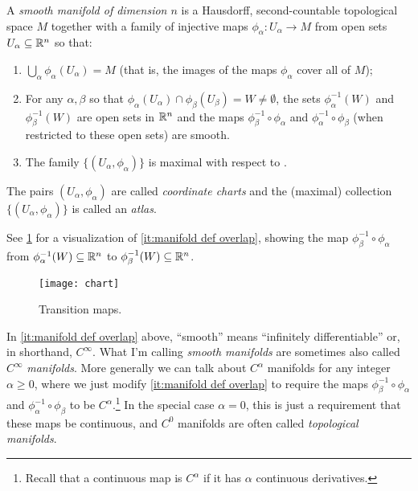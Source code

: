 \begin{definition}\label{def:manifold}
	A \emph{smooth manifold of dimension $n$} is a Hausdorff, second-countable topological space $M$ together with a family of injective maps $\phi_\alpha: U_\alpha \to M$ from open sets $U_\alpha \subseteq \mathbb{R}^n$ so that:
	\begin{enumerate}
		\item \label{it:manifold def cover}$\bigcup_\alpha \phi_\alpha(U_\alpha) = M$ (that is, the images of the maps $\phi_\alpha$ cover all of $M$);
		\item \label{it:manifold def overlap}For any $\alpha, \beta$ so that $\phi_\alpha(U_\alpha) \cap \phi_\beta(U_\beta) = W \neq \emptyset$, the sets $\phi_\alpha^{-1}(W)$ and $\phi_\beta^{-1}(W)$ are open sets in $\mathbb{R}^n$ and the maps $\phi_\beta^{-1} \circ \phi_\alpha$ and $\phi_\alpha^{-1} \circ \phi_\beta$ (when restricted to these open sets) are smooth.
		\item \label{it:manifold def maximal}The family $\{(U_\alpha, \phi_\alpha)\}$ is maximal with respect to .
	\end{enumerate}
	The pairs $(U_\alpha, \phi_\alpha)$ are called \emph{coordinate charts} and the (maximal) collection $\{(U_\alpha, \phi_\alpha)\}$ is called an \emph{atlas}.	
\end{definition}

See \cref{fig:chart} for a visualization of \ref{it:manifold def overlap}, showing the map $\phi_\beta^{-1} \circ \phi_\alpha$ from $\phi_\alpha^{-1}(W) \subseteq \mathbb{R}^n$ to $\phi_\beta^{-1}(W) \subseteq \mathbb{R}^n$.

\begin{figure}[htbp]
	\centering
		\texttt{[image: chart]}
	\caption{Transition maps.}
	\label{fig:chart}
\end{figure}

\begin{remark}
	In \ref{it:manifold def overlap} above, ``smooth'' means ``infinitely differentiable'' or, in shorthand, $C^\infty$. What I'm calling \emph{smooth manifolds} are sometimes also called $C^\infty$ \emph{manifolds}. More generally we can talk about $C^\alpha$ manifolds for any integer $\alpha \geq 0$, where we just modify \ref{it:manifold def overlap} to require the maps $\phi_\beta^{-1} \circ \phi_\alpha$ and $\phi_\alpha^{-1} \circ \phi_\beta$ to be $C^\alpha$.\footnote{Recall that a continuous map is $C^\alpha$ if it has $\alpha$ continuous derivatives.} In the special case $\alpha = 0$, this is just a requirement that these maps be continuous, and $C^0$ manifolds are often called \emph{topological manifolds}.
\end{remark}

